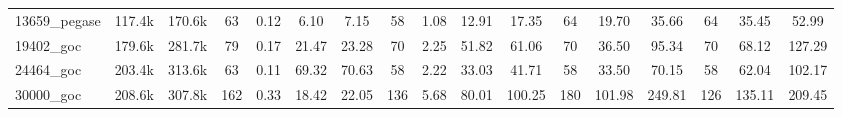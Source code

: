 \begin{tabular}{|l|c|c|cccc|cccc|ccc|ccc|}
13659\_pegase 
& 117.4k
& 170.6k
& 63 
&  0.12
&  6.10
&  7.15
& 58 
&  1.08
& 12.91
& 17.35
& 64 
& 19.70
& 35.66
& 64 
& 35.45
& 52.99
\\

19402\_goc 
& 179.6k
& 281.7k
& 79 
&  0.17
& 21.47
& 23.28
& 70 
&  2.25
& 51.82
& 61.06
& 70 
& 36.50
& 95.34
& 70 
& 68.12
& 127.29
\\

24464\_goc 
& 203.4k
& 313.6k
& 63 
&  0.11
& 69.32
& 70.63
& 58 
&  2.22
& 33.03
& 41.71
& 58 
& 33.50
& 70.15
& 58 
& 62.04
& 102.17
\\

30000\_goc 
& 208.6k
& 307.8k
& 162 
&  0.33
& 18.42
& 22.05
& 136 
&  5.68
& 80.01
& 100.25
& 180 
& 101.98
& 249.81
& 126 
& 135.11
& 209.45

  \\
  \hline
\end{tabular}